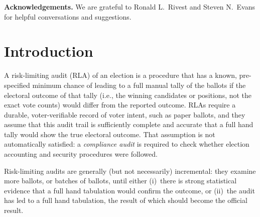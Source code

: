 \documentclass[runningheads]{llncs}
\begin{document}
\begin{abstract}
\end{abstract}

\noindent
\textbf{Acknowledgements.}
We are grateful to Ronald L.~Rivest and Steven N.~Evans for helpful conversations and suggestions.

\section{Introduction}
A risk-limiting audit (RLA) of an election is a procedure that
has a known, pre-specified minimum chance of leading to a full manual tally of the ballots if the electoral outcome of that tally (i.e., the winning candidates or positions, not the exact vote counts) would differ from the
reported outcome. 
RLAs require a durable, voter-verifiable record of voter intent, such as paper ballots,
and they assume that this audit trail is sufficiently complete and accurate that a full hand
tally would show the true electoral outcome.
That assumption is not automatically satisfied: a \emph{compliance audit}
\cite{starkWagner12} 
is required to check whether election accounting and security procedures were followed.

Risk-limiting audits are generally (but not necessarily) incremental: they examine more ballots, or batches of ballots,
until either (i)~there is strong statistical evidence that a full hand tabulation would confirm the outcome,
or (ii)~the audit has led to a full hand tabulation, the result of which should become the official
result.


\end{document}
